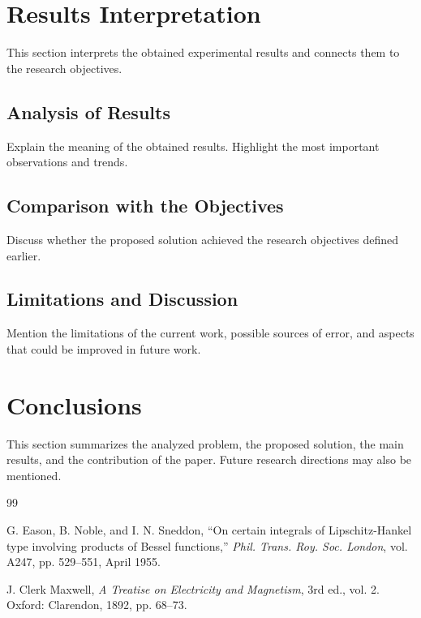 \documentclass[12pt,a4paper]{article}
\begin{document}
\section{Results Interpretation}

This section interprets the obtained experimental results and connects them to the research objectives.

\subsection{Analysis of Results}

Explain the meaning of the obtained results. Highlight the most important observations and trends.

\subsection{Comparison with the Objectives}

Discuss whether the proposed solution achieved the research objectives defined earlier.

\subsection{Limitations and Discussion}

Mention the limitations of the current work, possible sources of error, and aspects that could be improved in future work.

\section{Conclusions}

This section summarizes the analyzed problem, the proposed solution, the main results, and the contribution of the paper. Future research directions may also be mentioned.

\begin{thebibliography}{99}
\setlength{\itemsep}{0pt}

 G. Eason, B. Noble, and I. N. Sneddon, ``On certain integrals of Lipschitz-Hankel type involving products of Bessel functions,'' \emph{Phil. Trans. Roy. Soc. London}, vol. A247, pp. 529--551, April 1955.

 J. Clerk Maxwell, \emph{A Treatise on Electricity and Magnetism}, 3rd ed., vol. 2. Oxford: Clarendon, 1892, pp. 68--73.

\end{thebibliography}
\end{document}
